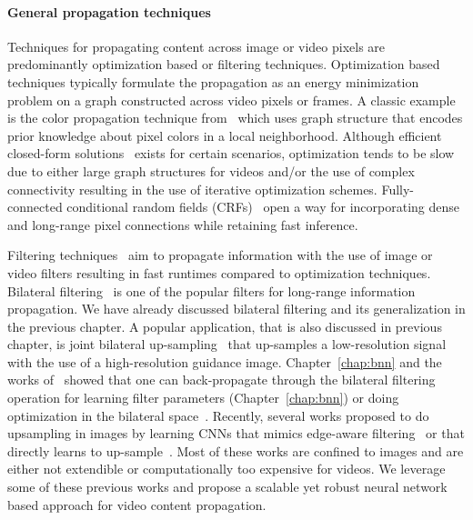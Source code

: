 \paragraph{General propagation techniques}
Techniques for propagating content across
image or video pixels are predominantly
optimization based or filtering techniques. Optimization
based techniques typically formulate the propagation as an energy minimization problem
on a graph constructed across video pixels or frames.
A classic example is the color propagation technique from~\cite{levin2004colorization} which uses
graph structure that encodes prior knowledge about pixel colors in a local neighborhood.
Although efficient closed-form
solutions~\cite{levin2008closed} exists for certain scenarios,
optimization tends to be slow due to either large graph structures for videos and/or the use of
complex connectivity resulting in the use of iterative optimization schemes. Fully-connected conditional
random fields (CRFs)~\cite{krahenbuhl2012efficient} open a way for incorporating dense
and long-range pixel connections while retaining fast inference.

Filtering techniques~\cite{kopf2007joint,chang2015propagated,he2013guided} aim to propagate
information with the use of image or video filters resulting in fast runtimes compared
to optimization techniques. Bilateral filtering~\cite{aurich1995non,tomasi1998bilateral} is
one of the popular filters for long-range information propagation.
We have already discussed bilateral filtering and its generalization in the previous
chapter. A popular application, that is also discussed in previous chapter, is joint
bilateral up-sampling~\cite{kopf2007joint} that up-samples a low-resolution signal with
the use of a high-resolution guidance image.
Chapter~\ref{chap:bnn} and the works
of~\cite{li2014mean,domke2013learning,zheng2015conditional,schwing2015fully,barron2015bilateral}
showed that one can back-propagate through the bilateral filtering operation for
learning filter parameters (Chapter~\ref{chap:bnn}) or doing optimization in the bilateral
space~\cite{barron2015bilateral,barron2015defocus}.
Recently, several works proposed to do upsampling
in images by learning CNNs that mimics edge-aware filtering~\cite{xu2015deep} or
that directly learns to up-sample~\cite{li2016deep,hui2016depth}.
Most of these works are confined to images and are either not extendible or computationally
too expensive for videos. We leverage some of these previous works and propose a
scalable yet robust neural network based approach for video content propagation.

